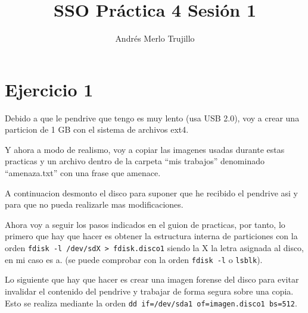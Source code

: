 \documentclass{article}
\title{SSO Práctica 4 Sesión 1}
\author{Andrés Merlo Trujillo}
\date{}
\begin{document}
\maketitle

\tableofcontents

\newpage

\section*{Ejercicio 1}

Debido a que le pendrive que tengo es muy lento (usa USB 2.0), voy a crear una particion de 1 GB con el sistema de archivos ext4.

Y ahora a modo de realismo, voy a copiar las imagenes usadas durante estas practicas y un archivo dentro de la carpeta ``mis trabajos'' denominado ``amenaza.txt'' con una frase que amenace.


A continuacion desmonto el disco para suponer que he recibido el pendrive asi y para que no pueda realizarle mas modificaciones.

Ahora voy a seguir los pasos indicados en el guion de practicas, por tanto, lo primero que hay que hacer es obtener la estructura interna de particiones con la orden \verb|fdisk -l /dev/sdX > fdisk.disco1| siendo la X la letra asignada al disco, en mi caso es a. (se puede comprobar con la orden \verb|fdisk -l| o \verb|lsblk|).


Lo siguiente que hay que hacer es crear una imagen forense del disco para evitar invalidar el contenido del pendrive y trabajar de forma segura sobre una copia. Esto se realiza mediante la orden \verb|dd if=/dev/sda1 of=imagen.disco1 bs=512|.

\end{document}
